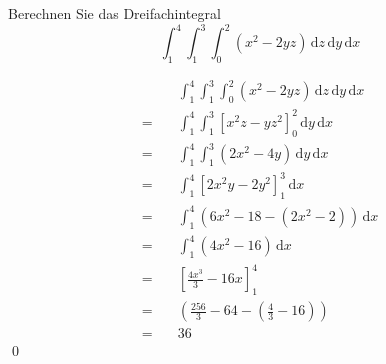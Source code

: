 \documentclass[answers]{exam}
\renewcommand{\d}{\,\mathrm{d}}
\begin{document}
\begin{questions}
    \newpage
    \question
    Berechnen Sie das Dreifachintegral
    $$
        \int^4_1 \int^3_1 \int^2_0 (x^2 - 2yz) \d z \d y \d x
    $$
    \begin{solution}
        $$
            \begin{aligned}
                        & \int^4_1 \int^3_1 \int^2_0 (x^2 - 2yz) \d z \d y \d x            \\
                = \quad & \int^4_1 \int^3_1 \left[x^2z - yz^2\right]^2_0 \d y \d x         \\
                = \quad & \int^4_1 \int^3_1 \left(2x^2 - 4y \right) \d y \d x              \\
                = \quad & \int^4_1 \left[2x^2y - 2y^2 \right]^3_1 \d x                     \\
                = \quad & \int^4_1 \left(6x^2 - 18 - (2x^2 - 2) \right) \d x               \\
                = \quad & \int^4_1 \left(4x^2 - 16 \right) \d x                            \\
                = \quad & \left[\frac{4x^3}{3} - 16x \right]^4_1                           \\
                = \quad & \left(\frac{256}{3} - 64 - \left(\frac{4}{3} - 16\right) \right) \\
                = \quad & 36
            \end{aligned}
        $$\qed
    \end{solution}
\end{questions}
\end{document}
